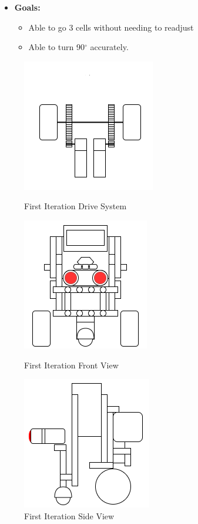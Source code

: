 \documentclass[11pt]{article}
\begin{document}
\begin{itemize}
\item \textbf{Goals:}
	\begin{itemize}
	\item Able to go 3 cells without needing to readjust
	\item Able to turn 90$^{\circ}$ accurately.
	\end{itemize}
\end{itemize}
\begin{figure}[htp]
\centering
\captionsetup{justification=centering}
\includegraphics[scale=0.80]{images/Hardware_Mechanical/First_Iteration_Design_Driving_System.png}
\caption{First Iteration Drive System}\label{fig:Drive System}
\endminipage\hfill
{}
\includegraphics[scale=0.79]{images/Hardware_Mechanical/First_Iteration_Design_FrontView.png}
\caption{First Iteration Front View}\label{fig:Front View}
\endminipage\hfill
{}
\includegraphics[scale=0.79]{images/Hardware_Mechanical/First_Iteration_Design_SideView.png}
\caption{First Iteration Side View}\label{Side View}
\endminipage
\end{figure}
\end{document}
